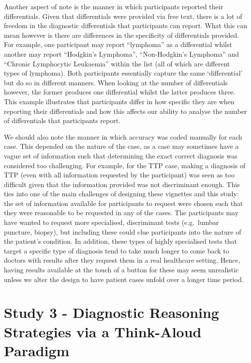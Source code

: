 \documentclass[a4paper, nobind]{templates/ociamthesis}
\begin{document}
Another aspect of note is the manner in which participants reported their differentials. Given that differentials were provided via free text, there is a lot of freedom in the diagnostic differentials that participants can report. What this can mean however is there are differences in the specificity of differentials provided. For example, one participant may report ``lymphoma'' as a differential whilst another may report ``Hodgkin's Lymphoma'', ``Non-Hodgkin's Lymphoma'' and ``Chronic Lymphocytic Leukaemia'' within the list (all of which are different types of lymphoma). Both participants essentially capture the same `differential' but do so in different manners. When looking at the number of differentials however, the former produces one differential whilst the latter produces three. This example illustrates that participants differ in how specific they are when reporting their differentials and how this affects our ability to analyse the number of differentials that participants report.

We should also note the manner in which accuracy was coded manually for each case. This depended on the nature of the case, as a case may sometimes have a vague set of information such that determining the exact correct diagnosis was considered too challenging. For example, for the TTP case, making a diagnosis of TTP (even with all information requested by the participant) was seen as too difficult given that the information provided was not discriminant enough. This ties into one of the main challenges of designing these vignettes and this study: the set of information available for participants to request were chosen such that they were reasonable to be requested in any of the cases. The participants may have wanted to request more specialised, discriminant tests (e.g.~lumbar puncture, biopsy), but including these could clue participants into the nature of the patient's condition. In addition, these types of highly specialised tests that target a specific type of diagnosis tend to take much longer to come back to doctors with results after they request them in a real healthcare setting. Hence, having results available at the touch of a button for these may seem unrealistic unless we alter the design to have patient cases unfold over a longer time period.

\chapter*{Study 3 - Diagnostic Reasoning Strategies via a Think-Aloud Paradigm}\label{study-3---diagnostic-reasoning-strategies-via-a-think-aloud-paradigm}
\end{document}

